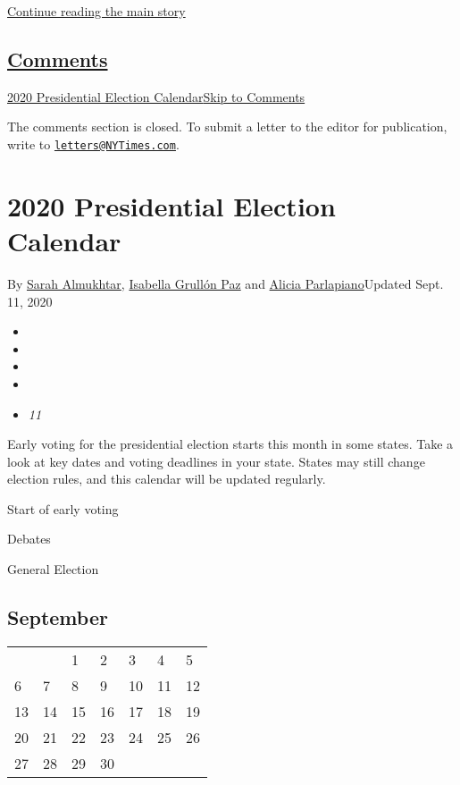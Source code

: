 \protect\hyperlink{after-top}{Continue reading the main story}

\hypertarget{comments}{%
\subsection{\texorpdfstring{\protect\hyperlink{commentsContainer}{Comments}}{Comments}}\label{comments}}

\href{}{2020 Presidential Election Calendar}\href{}{Skip to Comments}

The comments section is closed. To submit a letter to the editor for
publication, write to
\href{mailto:letters@NYTimes.com}{\nolinkurl{letters@NYTimes.com}}.

\hypertarget{2020-presidential-election-calendar}{%
\section{2020 Presidential Election
Calendar}\label{2020-presidential-election-calendar}}

By \href{https://www.nytimes3xbfgragh.onion/by/sarah-almukhtar}{Sarah
Almukhtar},
\href{https://www.nytimes3xbfgragh.onion/by/isabella-grullon-paz}{Isabella
Grullón Paz} and
\href{https://www.nytimes3xbfgragh.onion/by/alicia-parlapiano}{Alicia
Parlapiano}Updated Sept. 11, 2020

\begin{itemize}
\item
\item
\item
\item
\item
  \emph{11}
\end{itemize}

Early voting for the presidential election starts this month in some
states. Take a look at key dates and voting deadlines in your state.
States may still change election rules, and this calendar will be
updated regularly.

Start of early voting

Debates

General Election

\hypertarget{september}{%
\subsection{September}\label{september}}

\begin{longtable}[]{@{}lllllll@{}}
\toprule
\endhead
& & 1 & 2 & 3 & 4 & 5\tabularnewline
6 & 7 & 8 & 9 & 10 & 11 & 12\tabularnewline
13 & 14 & 15 & 16 & 17 & 18 & 19\tabularnewline
20 & 21 & 22 & 23 & 24 & 25 & 26\tabularnewline
27 & 28 & 29 & 30 & & &\tabularnewline
\bottomrule
\end{longtable}

